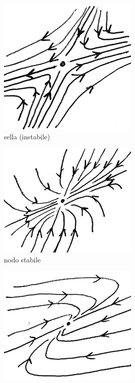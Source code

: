 \begin{figure}
\centering
 \begin{subfigure}{5cm}
  \includegraphics[width=0.75\textwidth]{sistemi_sella.png}
  \caption[1a]{sella (instabile)}
 \end{subfigure}
 \begin{subfigure}{5cm}
  \includegraphics[width=0.75\textwidth]{sistemi_nodo.png}
  \caption{nodo stabile}
 \end{subfigure}
 \begin{subfigure}{5cm}
  \includegraphics[width=0.75\textwidth]{sistemi_nodo_improprio.png}

\end{subfigure}
\end{figure}
